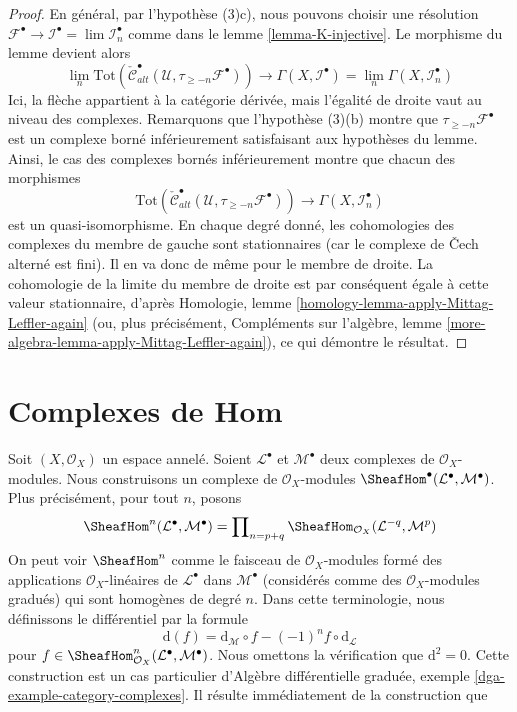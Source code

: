 {\begin{proof}
En général, par l'hypothèse (3)c), nous pouvons choisir une résolution
$\mathcal{F}^\bullet \to \mathcal{I}^\bullet = \lim \mathcal{I}_n^\bullet$
comme dans le lemme \ref{lemma-K-injective}. Le morphisme du lemme devient alors
$$
\lim_n 
\text{Tot}(\check{\mathcal{C}}^\bullet_{alt}(\mathcal{U},
\tau_{\geq -n}\mathcal{F}^\bullet))
\longrightarrow
\Gamma(X, \mathcal{I}^\bullet) =
\lim_n \Gamma(X, \mathcal{I}_n^\bullet)
$$
Ici, la flèche appartient à la catégorie dérivée, mais l'égalité de droite vaut au niveau des complexes. Remarquons que l'hypothèse (3)(b) montre que $\tau_{\geq -n}\mathcal{F}^\bullet$
est un complexe borné inférieurement satisfaisant aux hypothèses du lemme. Ainsi, le cas des complexes bornés inférieurement montre que chacun des morphismes
$$
\text{Tot}(\check{\mathcal{C}}^\bullet_{alt}(\mathcal{U},
\tau_{\geq -n}\mathcal{F}^\bullet))
\longrightarrow
\Gamma(X, \mathcal{I}_n^\bullet)
$$
est un quasi-isomorphisme. En chaque degré donné, les cohomologies des complexes du membre de gauche sont stationnaires (car le complexe de {\v C}ech alterné est fini). Il en va donc de même pour le membre de droite. La cohomologie de la limite du membre de droite est par conséquent égale à cette valeur stationnaire, d'après Homologie, lemme \ref{homology-lemma-apply-Mittag-Leffler-again}
(ou, plus précisément, Compléments sur l'algèbre, lemme
\ref{more-algebra-lemma-apply-Mittag-Leffler-again}), ce qui démontre le résultat.

\end{proof}





\section{Complexes de Hom}

\label{section-hom-complexes}

\noindent

Soit $(X, \mathcal{O}_X)$ un espace annelé. Soient
$\mathcal{L}^\bullet$ et $\mathcal{M}^\bullet$ deux complexes de $\mathcal{O}_X$-modules. Nous construisons un complexe de $\mathcal{O}_X$-modules
$\SheafHom^\bullet(\mathcal{L}^\bullet, \mathcal{M}^\bullet)$. Plus précisément, pour tout $n$, posons
$$
\SheafHom^n(\mathcal{L}^\bullet, \mathcal{M}^\bullet) =
\prod\nolimits_{n = p + q}
\SheafHom_{\mathcal{O}_X}(\mathcal{L}^{-q}, \mathcal{M}^p)
$$
On peut voir $\SheafHom^n$ comme le faisceau de $\mathcal{O}_X$-modules formé des applications $\mathcal{O}_X$-linéaires de $\mathcal{L}^\bullet$ dans $\mathcal{M}^\bullet$
(considérés comme des $\mathcal{O}_X$-modules gradués) qui sont homogènes de degré $n$. Dans cette terminologie, nous définissons le différentiel par la formule
$$
\text{d}(f) =
\text{d}_\mathcal{M} \circ f - (-1)^n f \circ \text{d}_\mathcal{L}
$$
pour
$f \in \SheafHom^n_{\mathcal{O}_X}(\mathcal{L}^\bullet, \mathcal{M}^\bullet)$. Nous omettons la vérification que $\text{d}^2 = 0$. Cette construction est un cas particulier d'Algèbre différentielle graduée, exemple \ref{dga-example-category-complexes}. Il résulte immédiatement de la construction que

}
